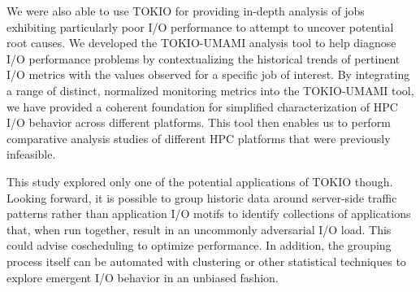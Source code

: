 We were also able to use TOKIO for providing in-depth analysis of jobs exhibiting particularly poor I/O performance to attempt to uncover potential root causes.
We developed the TOKIO-UMAMI analysis tool to help diagnose I/O performance problems by contextualizing the historical trends of pertinent I/O metrics with the values observed for a specific job of interest.
By integrating a range of distinct, normalized monitoring metrics into the TOKIO-UMAMI tool, we have provided a coherent foundation for simplified characterization of HPC I/O behavior across different platforms.
This tool then enables us to perform comparative analysis studies of different HPC platforms that were previously infeasible.

This study explored only one of the potential applications of TOKIO though.  Looking forward, it is possible to group historic data around server-side traffic patterns rather than application I/O motifs to identify collections of applications that, when run together, result in an uncommonly adversarial I/O load.  This could advise coscheduling to optimize performance.  In addition, the grouping process itself can be automated with clustering or other statistical techniques to explore emergent I/O behavior in an unbiased fashion.



